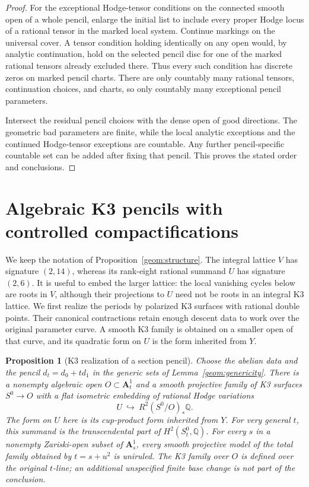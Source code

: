 \documentclass[11pt]{amsart}
\newcommand{\Q}{\mathbb Q}
\renewcommand{\AA}{\mathbf A}
\newtheorem{proposition}[theorem]{Proposition}
\theoremstyle{definition}
\theoremstyle{remark}
\numberwithin{equation}{section}
\begin{document}
\begin{proof}
For the exceptional Hodge-tensor conditions on the connected smooth
open of a whole pencil, enlarge the initial list to include every
proper Hodge locus of a rational tensor in the marked local system.
Continue markings on the universal cover.  A tensor condition
holding identically on any open would, by analytic continuation,
hold on the selected pencil disc for one of the marked rational
tensors already excluded there.  Thus every such condition has
discrete zeros on marked pencil charts.  There are only countably
many rational tensors, continuation choices, and charts, so only
countably many exceptional pencil parameters.

Intersect the residual pencil choices with the dense open of good
directions.  The geometric bad parameters are finite, while the local
analytic exceptions and the continued Hodge-tensor exceptions are
countable.  Any further pencil-specific countable set can be added
after fixing that pencil.  This proves the stated order and conclusions.
\end{proof}
\section{Algebraic K3 pencils with controlled compactifications}
\label{pencil:section}

We keep the notation of Proposition~\ref{geom:structure}.  The integral lattice
\(V\) has signature \((2,14)\), whereas its rank-eight rational summand \(U\)
has signature \((2,6)\).  It is useful to embed the larger lattice: the local
vanishing cycles below are roots in \(V\), although their projections to
\(U\) need not be roots in an integral K3 lattice.  We first realize the
periods by polarized K3 surfaces with rational double points.  Their
canonical contractions retain enough descent data to work over the
original parameter curve.  A smooth K3 family is obtained on a smaller
open of that curve, and its quadratic form on \(U\) is the form inherited
from \(Y\).

\begin{proposition}[K3 realization of a section pencil]
\label{pencil:realization}
Choose the abelian data and the pencil \(d_t=d_0+t d_1\) in the generic
sets of Lemma~\ref{geom:genericity}.  There is a nonempty algebraic open
\(O\subset\AA^1_t\) and a smooth projective
family of K3 surfaces \(S^0\to O\) with a flat isometric embedding of
rational Hodge variations
\[
 U\ \hookrightarrow\ R^2(S^0/O)_*\Q.
\]
The form on \(U\) here is its cup-product form inherited from \(Y\).
For very general \(t\), this summand is the transcendental part of
\(H^2(S^0_t,\Q)\).  For every \(s\) in a nonempty Zariski-open subset
of \(\AA^1_s\), every smooth projective model of the total family
obtained by \(t=s+u^2\) is uniruled.  The K3
family over \(O\) is defined over the original \(t\)-line; an additional
unspecified finite base change is not part of the conclusion.
\end{proposition}
\end{document}

